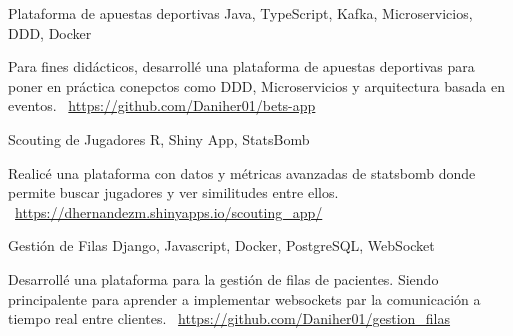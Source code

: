 \documentclass[]{awesome-cv}
\begin{document}
\begin{cventries}
	\vspace{-3mm}
	\cventry
	{}
	{Plataforma de apuestas deportivas \vspace{-5mm}}
	{Java, TypeScript, Kafka, Microservicios, DDD, Docker \vspace{-5mm}}
	{}
	{\begin{cvsectionnormaltext}
		\item {Para fines didácticos, desarrollé una plataforma de apuestas deportivas para poner en práctica conepctos como DDD, Microservicios y arquitectura basada en eventos. 
		\newline \faLink\ \href{https://github.com/Daniher01/bets-app}{https://github.com/Daniher01/bets-app}}
	\end{cvsectionnormaltext}}

	\vspace{-3mm}
	\cventry
	{}
	{Scouting de Jugadores \vspace{-5mm}}
	{R, Shiny App, StatsBomb \vspace{-5mm}}
	{}
	{\begin{cvsectionnormaltext}
		\item {Realicé una plataforma con datos y métricas avanzadas de statsbomb donde permite buscar jugadores y ver similitudes entre ellos.
		\newline \faLink\ \href{https://dhernandezm.shinyapps.io/scouting_app/}{https://dhernandezm.shinyapps.io/scouting\_app/}}
	\end{cvsectionnormaltext}}
	
	\vspace{-3mm}
	\cventry
	{}
	{Gestión de Filas \vspace{-5mm}}
	{Django, Javascript, Docker, PostgreSQL, WebSocket \vspace{-5mm}}
	{}
	{\begin{cvsectionnormaltext}
		\item {Desarrollé una plataforma para la gestión de filas de pacientes. Siendo principalente para aprender a implementar websockets par la comunicación a tiempo real entre clientes. 
		\newline \faLink\ \href{https://github.com/Daniher01/gestion_filas}{https://github.com/Daniher01/gestion\_filas}}
	\end{cvsectionnormaltext}}
	
	\vspace{-5mm}
	
\end{cventries}
\end{document}
